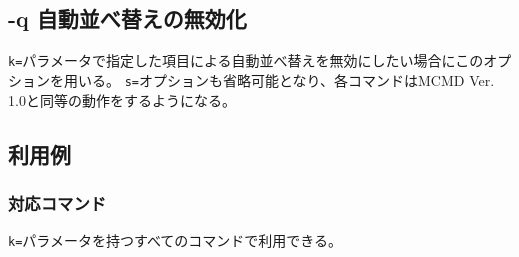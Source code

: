 
%

\subsection{-q 自動並べ替えの無効化\label{sect:option_q}}

\verb|k=|パラメータで指定した項目による自動並べ替えを無効にしたい場合にこのオプションを用いる。
\verb|s=|オプションも省略可能となり、各コマンドはMCMD Ver. 1.0と同等の動作をするようになる。

\subsection*{利用例}


\subsubsection*{対応コマンド}
\verb|k=|パラメータを持つすべてのコマンドで利用できる。

%

